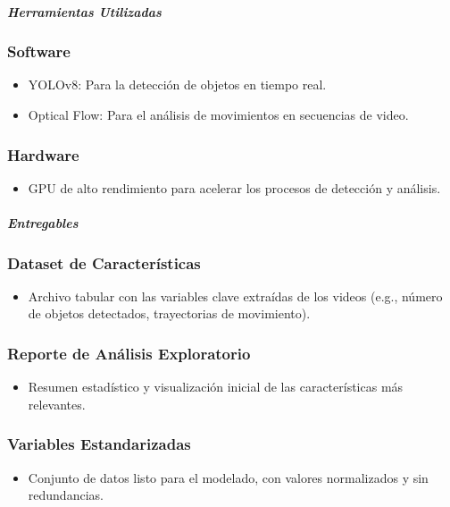 \paragraph{\textit{Herramientas Utilizadas}}

\subsubsection{Software}
\begin{itemize}
    \item YOLOv8: Para la detección de objetos en tiempo real.
    \item Optical Flow: Para el análisis de movimientos en secuencias de video.
\end{itemize}

\subsubsection{Hardware}
\begin{itemize}
    \item GPU de alto rendimiento para acelerar los procesos de detección y análisis.
\end{itemize}

\paragraph{\textit{Entregables}}

\subsubsection{Dataset de Características}
\begin{itemize}
    \item Archivo tabular con las variables clave extraídas de los videos (e.g., número de objetos detectados, trayectorias de movimiento).
\end{itemize}

\subsubsection{Reporte de Análisis Exploratorio}
\begin{itemize}
    \item Resumen estadístico y visualización inicial de las características más relevantes.
\end{itemize}

\subsubsection{Variables Estandarizadas}
\begin{itemize}
    \item Conjunto de datos listo para el modelado, con valores normalizados y sin redundancias.
\end{itemize}


